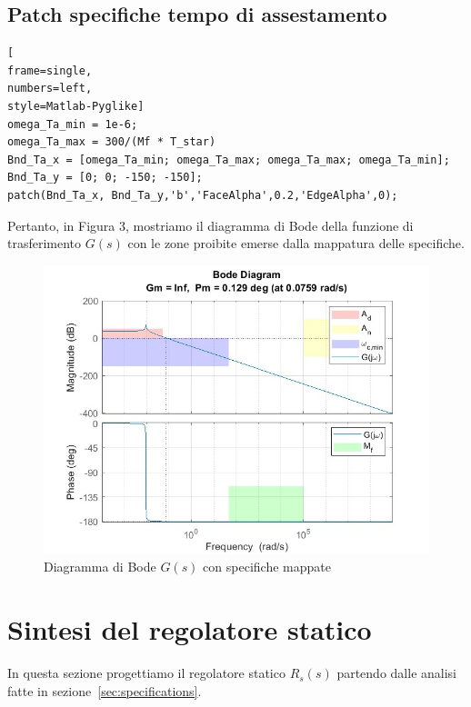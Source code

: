 \documentclass[a4paper, 11pt]{article}
\begin{document}
\subsection{\textbf{Patch specifiche tempo di assestamento}}

\begin{lstlisting}[
frame=single,
numbers=left,
style=Matlab-Pyglike]
omega_Ta_min = 1e-6;
omega_Ta_max = 300/(Mf * T_star)
Bnd_Ta_x = [omega_Ta_min; omega_Ta_max; omega_Ta_max; omega_Ta_min];
Bnd_Ta_y = [0; 0; -150; -150];
patch(Bnd_Ta_x, Bnd_Ta_y,'b','FaceAlpha',0.2,'EdgeAlpha',0);

\end{lstlisting}

Pertanto, in Figura 3, mostriamo il diagramma di Bode della funzione di trasferimento $G(s)$ con le zone proibite emerse dalla mappatura delle specifiche.

\begin{figure} [!htp]
    \centering
    \includegraphics[scale = 0.45]{Immagini/BODE/bode_G.jpg}
    \caption{Diagramma di Bode $G(s)$ con specifiche mappate}
    \label{fig:enter-label}
\end{figure}

\vspace{12cm}

\section{Sintesi del regolatore statico}
\label{sec:static_regulator}

In questa sezione progettiamo il regolatore statico $R_s(s)$ partendo dalle analisi fatte in sezione~\ref{sec:specifications}.
\end{document}
